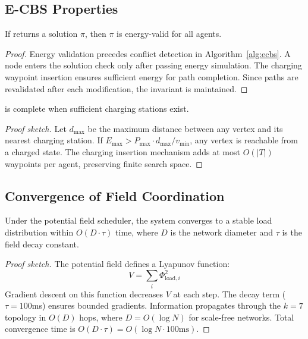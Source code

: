 \subsection{E-CBS Properties}

\begin{theorem}
If \ecbs{} returns a solution $\pi$, then $\pi$ is energy-valid for all agents.
\end{theorem}

\begin{proof}
Energy validation precedes conflict detection in Algorithm~\ref{alg:ecbs}. A node enters the solution check only after passing energy simulation. The charging waypoint insertion ensures sufficient energy for path completion. Since paths are revalidated after each modification, the invariant is maintained.
\end{proof}

\begin{theorem}
\ecbs{} is complete when sufficient charging stations exist.
\end{theorem}

\begin{proof}[Proof sketch]
Let $d_{\max}$ be the maximum distance between any vertex and its nearest charging station. If $E_{\max} > P_{\max} \cdot d_{\max} / v_{\min}$, any vertex is reachable from a charged state. The charging insertion mechanism adds at most $O(|T|)$ waypoints per agent, preserving finite search space.
\end{proof}

\subsection{Convergence of Field Coordination}

\begin{theorem}
Under the potential field scheduler, the system converges to a stable load distribution within $O(D \cdot \tau)$ time, where $D$ is the network diameter and $\tau$ is the field decay constant.
\end{theorem}

\begin{proof}[Proof sketch]
The potential field defines a Lyapunov function:
\begin{equation}
V = \sum_{i} \Phi_{\text{load},i}^2
\end{equation}
Gradient descent on this function decreases $V$ at each step. The decay term ($\tau = 100$ms) ensures bounded gradients. Information propagates through the $k=7$ topology in $O(D)$ hops, where $D = O(\log N)$ for scale-free networks. Total convergence time is $O(D \cdot \tau) = O(\log N \cdot 100\text{ms})$.
\end{proof}

